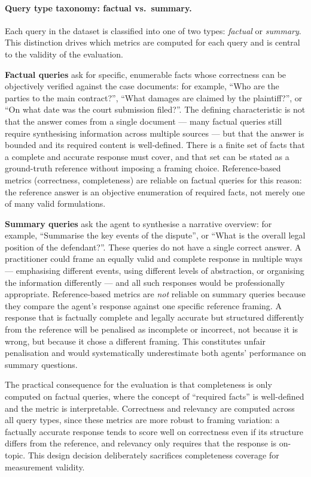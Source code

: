 \paragraph{Query type taxonomy: factual vs.\ summary.}
Each query in the dataset is classified into one of two types: \emph{factual} or \emph{summary}. This distinction drives which metrics are computed for each query and is central to the validity of the evaluation.

\textbf{Factual queries} ask for specific, enumerable facts whose correctness can be objectively verified against the case documents: for example, ``Who are the parties to the main contract?'', ``What damages are claimed by the plaintiff?'', or ``On what date was the court submission filed?''. The defining characteristic is not that the answer comes from a single document --- many factual queries still require synthesising information across multiple sources --- but that the answer is bounded and its required content is well-defined. There is a finite set of facts that a complete and accurate response must cover, and that set can be stated as a ground-truth reference without imposing a framing choice. Reference-based metrics (correctness, completeness) are reliable on factual queries for this reason: the reference answer is an objective enumeration of required facts, not merely one of many valid formulations.

\textbf{Summary queries} ask the agent to synthesise a narrative overview: for example, ``Summarise the key events of the dispute'', or ``What is the overall legal position of the defendant?''. These queries do not have a single correct answer. A practitioner could frame an equally valid and complete response in multiple ways --- emphasising different events, using different levels of abstraction, or organising the information differently --- and all such responses would be professionally appropriate. Reference-based metrics are \emph{not} reliable on summary queries because they compare the agent's response against one specific reference framing. A response that is factually complete and legally accurate but structured differently from the reference will be penalised as incomplete or incorrect, not because it is wrong, but because it chose a different framing. This constitutes unfair penalisation and would systematically underestimate both agents' performance on summary questions.

The practical consequence for the evaluation is that completeness is only computed on factual queries, where the concept of ``required facts'' is well-defined and the metric is interpretable. Correctness and relevancy are computed across all query types, since these metrics are more robust to framing variation: a factually accurate response tends to score well on correctness even if its structure differs from the reference, and relevancy only requires that the response is on-topic. This design decision deliberately sacrifices completeness coverage for measurement validity.

